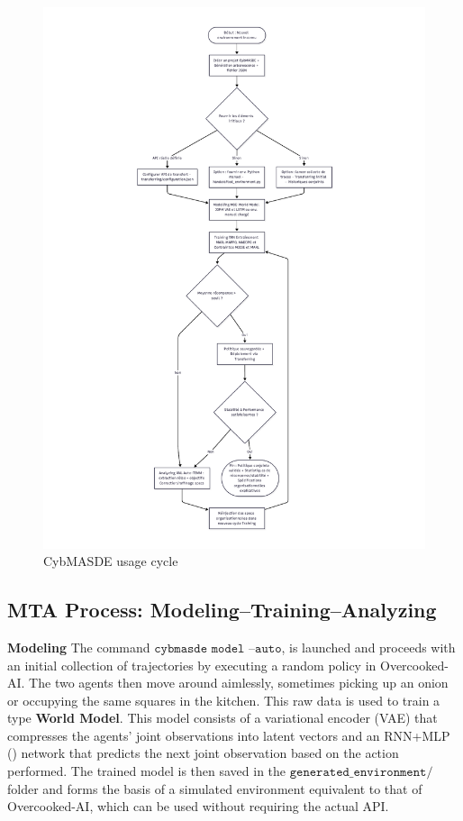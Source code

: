 \begin{figure}[H]
  \centering
  \includegraphics[trim={5cm 1cm 5cm 1cm},clip,height=\textheight]{figures/CybMASDE_user_flowchart.pdf}
  \caption{CybMASDE usage cycle}
  \label{fig:cybmasde_cycle}
\end{figure}

\subsection{MTA Process: Modeling–Training–Analyzing}

\noindent
\textbf{Modeling} \quad
The command $\texttt{cybmasde model --auto}$,  is launched and proceeds with an initial collection of trajectories by executing a random policy in Overcooked-AI. The two agents then move around aimlessly, sometimes picking up an onion or occupying the same squares in the kitchen. This raw data is used to train a  type \textbf{World Model}. This model consists of a variational encoder (VAE) that compresses the agents' joint observations into latent vectors and an RNN+MLP () network that predicts the next joint observation based on the action performed. The trained model is then saved in the $\texttt{generated\_environment/}$ folder and forms the basis of a simulated environment equivalent to that of Overcooked-AI, which can be used without requiring the actual API.

